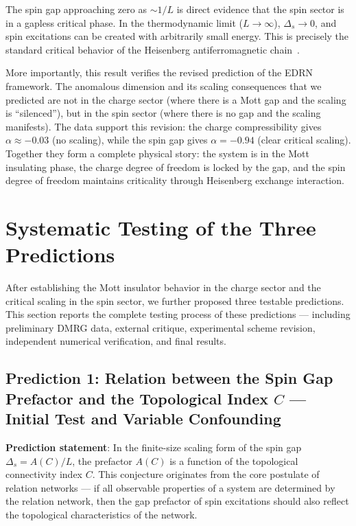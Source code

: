 \documentclass[prb,reprint,twocolumn,superscriptaddress]{revtex4-2}
\begin{document}
The spin gap approaching zero as $\sim 1/L$ is direct evidence that the spin sector is in a gapless critical phase. In the thermodynamic limit ($L \to \infty$), $\Delta_s \to 0$, and spin excitations can be created with arbitrarily small energy. This is precisely the standard critical behavior of the Heisenberg antiferromagnetic chain~\cite{Affleck1989,Giamarchi2004,Schulz1990}.

More importantly, this result verifies the revised prediction of the EDRN framework. The anomalous dimension and its scaling consequences that we predicted are not in the charge sector (where there is a Mott gap and the scaling is ``silenced''), but in the spin sector (where there is no gap and the scaling manifests). The data support this revision: the charge compressibility gives $\alpha \approx -0.03$ (no scaling), while the spin gap gives $\alpha = -0.94$ (clear critical scaling). Together they form a complete physical story: the system is in the Mott insulating phase, the charge degree of freedom is locked by the gap, and the spin degree of freedom maintains criticality through Heisenberg exchange interaction.

\section{Systematic Testing of the Three Predictions}\label{sec:predictions}

After establishing the Mott insulator behavior in the charge sector and the critical scaling in the spin sector, we further proposed three testable predictions. This section reports the complete testing process of these predictions --- including preliminary DMRG data, external critique, experimental scheme revision, independent numerical verification, and final results.

\subsection{Prediction 1: Relation between the Spin Gap Prefactor and the Topological Index $C$ --- Initial Test and Variable Confounding}

\textbf{Prediction statement}: In the finite-size scaling form of the spin gap $\Delta_s = A(C)/L$, the prefactor $A(C)$ is a function of the topological connectivity index $C$. This conjecture originates from the core postulate of relation networks --- if all observable properties of a system are determined by the relation network, then the gap prefactor of spin excitations should also reflect the topological characteristics of the network.
\end{document}
